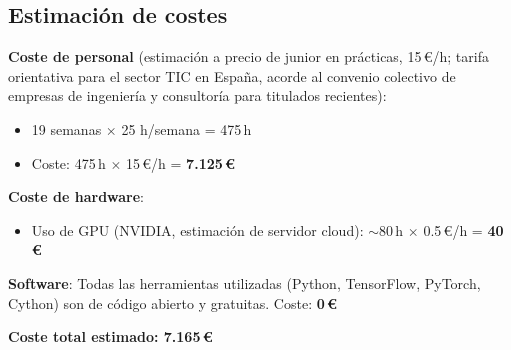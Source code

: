 \subsection{Estimación de costes}

\textbf{Coste de personal} (estimación a precio de junior en prácticas, 15\,€/h; tarifa orientativa
para el sector TIC en España, acorde al convenio colectivo de empresas de ingeniería y consultoría
para titulados recientes):
\begin{itemize}
  \item 19 semanas $\times$ 25 h/semana = 475\,h
  \item Coste: 475\,h $\times$ 15\,€/h = \textbf{7.125\,€}
\end{itemize}

\textbf{Coste de hardware}:
\begin{itemize}
  \item Uso de GPU (NVIDIA, estimación de servidor cloud): $\sim$80\,h $\times$ 0.5\,€/h =
        \textbf{40\,€}
\end{itemize}

\textbf{Software}: Todas las herramientas utilizadas (Python, TensorFlow, PyTorch, Cython) son de
código abierto y gratuitas. Coste: \textbf{0\,€}

\textbf{Coste total estimado: 7.165\,€}
